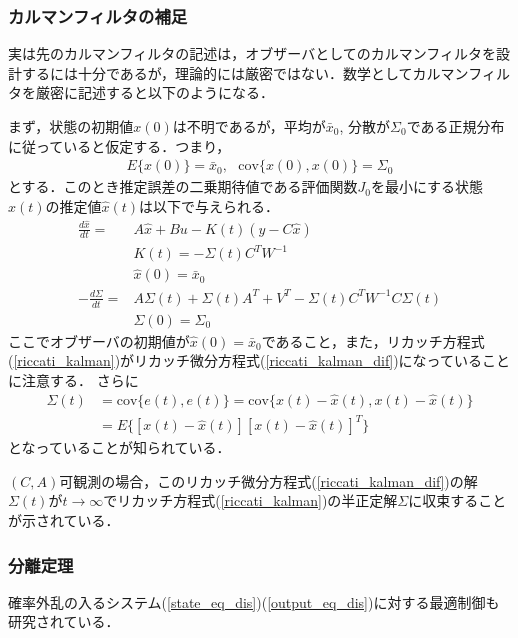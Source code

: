 \subsubsection{カルマンフィルタの補足}

実は先のカルマンフィルタの記述は，オブザーバとしてのカルマンフィルタを設計するには十分であるが，理論的には厳密ではない．数学としてカルマンフィルタを厳密に記述すると以下のようになる．

まず，状態の初期値$x(0)$は不明であるが，平均が$\bar{x}_0$, 分散が$\Sigma_0$である正規分布に従っていると仮定する．つまり，
\begin{align}
     E\{x(0) \} = \bar{x}_0, \ \ \ \mbox{cov} \{ x(0), x(0) \} = \Sigma_0
\end{align}
とする．このとき推定誤差の二乗期待値である評価関数$J_0$を最小にする状態$x(t)$の推定値$\hat{x}(t)$は以下で与えられる．
\begin{align}
 \frac{d \hat{x}}{dt} =& A \hat{x} + B u - K(t) (y - C \hat{x})
\\
 & K(t) = - \Sigma(t) C^T W^{-1}
\\
 & \hat{x}(0) = \bar{x}_0
\\
 - \frac{d \Sigma}{dt} = & A \Sigma(t) + \Sigma(t) A^T +  V ^T - \Sigma(t) C^T W^{-1} C \Sigma(t)
\label{riccati_kalman_dif}
\\
 & \Sigma(0) = \Sigma_0
\end{align}
ここでオブザーバの初期値が$\hat{x}(0)=\bar{x}_0$であること，また，リカッチ方程式(\ref{riccati_kalman})がリカッチ微分方程式(\ref{riccati_kalman_dif})になっていることに注意する．
さらに
\begin{align}
     \Sigma(t) &= \mbox{cov} \{ e(t), e(t) \} = \mbox{cov} \{ x(t)-\hat{x}(t),  x(t)-\hat{x}(t)\} 
\nonumber\\
     &= E \{ [x(t)-\hat{x}(t)][x(t)-\hat{x}(t)]^T \}
\end{align}
となっていることが知られている．


$(C,A)$可観測の場合，このリカッチ微分方程式(\ref{riccati_kalman_dif})の解$\Sigma(t)$が$t \rightarrow \infty$でリカッチ方程式(\ref{riccati_kalman})の半正定解$\Sigma$に収束することが示されている．


\subsubsection{分離定理}

確率外乱の入るシステム(\ref{state_eq_dis})(\ref{output_eq_dis})に対する最適制御も研究されている．

